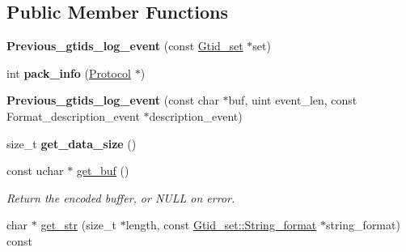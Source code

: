 \subsection*{Public Member Functions}
\begin{DoxyCompactItemize}
\item 
\mbox{\label{classPrevious__gtids__log__event_a5849e5721e6b985db5c1d0c28903d453}} 
{\bfseries Previous\+\_\+gtids\+\_\+log\+\_\+event} (const \mbox{\hyperlink{classGtid__set}{Gtid\+\_\+set}} $\ast$set)
\item 
\mbox{\label{classPrevious__gtids__log__event_a39c39055321656de82d614fcfe8d61a9}} 
int {\bfseries pack\+\_\+info} (\mbox{\hyperlink{classProtocol}{Protocol}} $\ast$)
\item 
\mbox{\label{classPrevious__gtids__log__event_a7ac7814f32bcceabf97aa9a2a9b7ef3b}} 
{\bfseries Previous\+\_\+gtids\+\_\+log\+\_\+event} (const char $\ast$buf, uint event\+\_\+len, const Format\+\_\+description\+\_\+event $\ast$description\+\_\+event)
\item 
\mbox{\label{classPrevious__gtids__log__event_a7a67e2b1c50110c1d9a26d2651d40243}} 
size\+\_\+t {\bfseries get\+\_\+data\+\_\+size} ()
\item 
\mbox{\label{classPrevious__gtids__log__event_a1a7258585c046fbf54d33ffad07b6f97}} 
const uchar $\ast$ \mbox{\hyperlink{classPrevious__gtids__log__event_a1a7258585c046fbf54d33ffad07b6f97}{get\+\_\+buf}} ()
\begin{DoxyCompactList}\small\item\em Return the encoded buffer, or N\+U\+LL on error. \end{DoxyCompactList}\item 
char $\ast$ \mbox{\hyperlink{classPrevious__gtids__log__event_a280253bba0731a81c2ae0be0fb5a1181}{get\+\_\+str}} (size\+\_\+t $\ast$length, const \mbox{\hyperlink{structGtid__set_1_1String__format}{Gtid\+\_\+set\+::\+String\+\_\+format}} $\ast$string\+\_\+format) const
\item 
\mbox{\label{classPrevious__gtids__log__event_a4701bc081dd3a56e13acedfbf07e0fab}} 

\end{DoxyCompactItemize}
